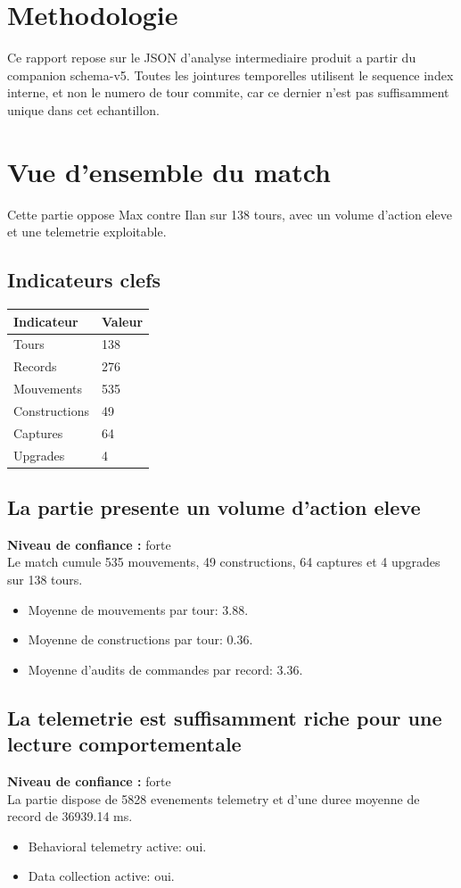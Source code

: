 \documentclass[11pt,a4paper]{article}
\begin{document}
\section{Methodologie}
Ce rapport repose sur le JSON d'analyse intermediaire produit a partir du companion schema-v5. Toutes les jointures temporelles utilisent le sequence index interne, et non le numero de tour commite, car ce dernier n'est pas suffisamment unique dans cet echantillon.
\section{Vue d'ensemble du match}
Cette partie oppose Max contre Ilan sur 138 tours, avec un volume d'action eleve et une telemetrie exploitable.
\subsection*{Indicateurs clefs}
\begin{tabularx}{\linewidth}{lX}
\toprule
Indicateur & Valeur \\
\midrule
Tours & 138 \\
Records & 276 \\
Mouvements & 535 \\
Constructions & 49 \\
Captures & 64 \\
Upgrades & 4 \\
\bottomrule
\end{tabularx}
\subsection*{La partie presente un volume d'action eleve}
\textbf{Niveau de confiance :} forte\\
Le match cumule 535 mouvements, 49 constructions, 64 captures et 4 upgrades sur 138 tours.
\begin{itemize}
\item Moyenne de mouvements par tour: 3.88.
\item Moyenne de constructions par tour: 0.36.
\item Moyenne d'audits de commandes par record: 3.36.
\end{itemize}
\subsection*{La telemetrie est suffisamment riche pour une lecture comportementale}
\textbf{Niveau de confiance :} forte\\
La partie dispose de 5828 evenements telemetry et d'une duree moyenne de record de 36939.14 ms.
\begin{itemize}
\item Behavioral telemetry active: oui.
\item Data collection active: oui.
\end{itemize}
\end{document}
